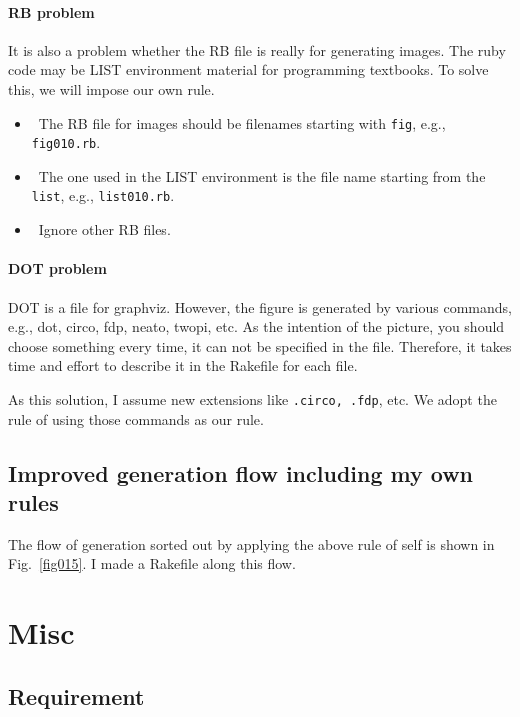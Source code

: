 \documentclass[a4paper,12pt]{jsarticle}
\begin{document}
\paragraph {RB problem}

It is also a problem whether the RB file is really for generating images.
The ruby code may be LIST environment material for programming textbooks.
To solve this, we will impose our own rule.


\begin{itemize}
  \item The RB file for images should be filenames starting with \verb/fig/, e.g., \verb/fig010.rb/.                 
  \item The one used in the LIST environment is the file name starting from the \verb/list/, e.g., \verb/list010.rb/. 
  \item Ignore other RB files.                                                  
\end{itemize}


\paragraph {DOT problem}

DOT is a file for graphviz.
However, the figure is generated by various commands, e.g., dot, circo, fdp, neato, twopi, etc.
As the intention of the picture, you should choose something every time,
it can not be specified in the file.
Therefore, it takes time and effort to describe it in the Rakefile for each file.

As this solution,
I assume new extensions like \verb/.circo, .fdp/, etc.
We adopt the rule of using those commands as our rule.

\subsection*{Improved generation flow including my own rules}

The flow of generation sorted out by applying the above rule of self is shown in Fig.~\ref{fig015}.
I made a Rakefile along this flow.


\section{Misc}

\subsection{Requirement}
\end{document}
